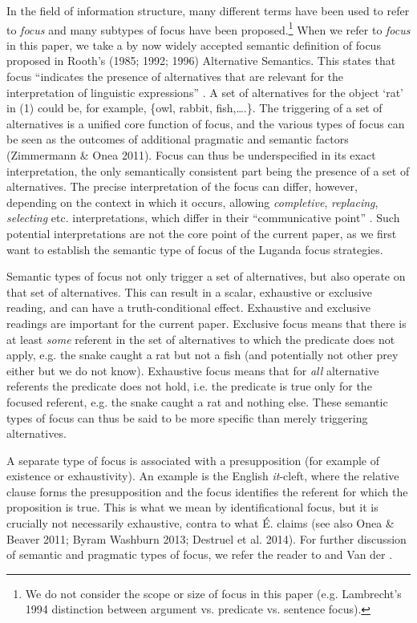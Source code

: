 \documentclass[output=paper]{langsci/langscibook}
\begin{document}
  In the field of information structure, many different terms have been used to refer to \textit{focus} and many subtypes of focus have been proposed.\footnote{ We do not consider the scope or size of focus in this paper (e.g. Lambrecht’s 1994 distinction between argument vs. predicate vs. sentence focus).}{ }When we refer to \textit{focus} in this paper, we take a by now widely accepted semantic definition of focus proposed in Rooth’s (1985; 1992; 1996) Alternative Semantics. This states that focus “indicates the presence of alternatives that are relevant for the interpretation of linguistic expressions” \citep[6]{Krifka2007}. A set of alternatives for the object ‘rat’ in (1) could be, for example, \{owl, rabbit, fish,….\}. The triggering of a set of alternatives is a unified core function of focus, and the various types of focus can be seen as the outcomes of additional pragmatic and semantic factors (Zimmermann \& Onea 2011). Focus can thus be underspecified in its exact interpretation, the only semantically consistent part being the presence of a set of alternatives. The precise interpretation of the focus can differ, however, depending on the context in which it occurs, allowing \textit{completive}, \textit{replacing}, \textit{selecting} etc. interpretations, which differ in their “communicative point” \citep[281]{Dik1997}. Such potential interpretations are not the core point of the current paper, as we first want to establish the semantic type of focus of the Luganda focus strategies. 

  Semantic types of focus not only trigger a set of alternatives, but also operate on that set of alternatives. This can result in a scalar, exhaustive or exclusive reading, and can have a truth-conditional effect. Exhaustive and exclusive readings are important for the current paper. Exclusive focus means that there is at least \textit{some }referent in the set of alternatives to which the predicate does not apply, e.g. the snake caught a rat but not a fish (and potentially not other prey either but we do not know). Exhaustive focus means that for \textit{all }alternative referents the predicate does not hold, i.e. the predicate is true only for the focused referent, e.g. the snake caught a rat and nothing else. These semantic types of focus can thus be said to be more specific than merely triggering alternatives.

  A separate type of focus is associated with a presupposition (for example of existence or exhaustivity). An example is the English \textit{it}{}-cleft, where the relative clause forms the presupposition and the focus identifies the referent for which the proposition is true. This is what we mean by identificational focus, but it is crucially not necessarily exhaustive, contra to what É. \citet{Kiss1998} claims (see also Onea \& Beaver 2011; Byram Washburn 2013; Destruel et al. 2014). For further discussion of semantic and pragmatic types of focus, we refer the reader to \citet{Bazalgette2015} and Van der \citet{Wal2016}.  
\end{document}
